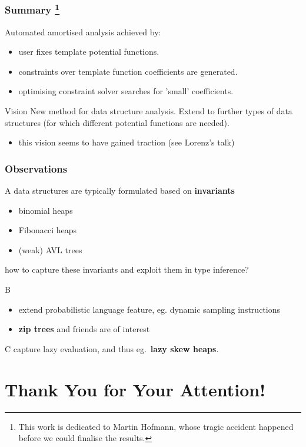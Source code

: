 \documentclass[
11pt,
usepdftitle=false,
aspectratio=169,
xcolor={table,usenames,dvipsnames},
]{beamer}
\newenvironment{mybox}[1]{\begin{block}{#1}}{\end{block}}
\begin{document}
\begin{frame}
  \frametitle{Summary%
    \footnote{This work is dedicated to Martin Hofmann, whose tragic accident happened before we could finalise the results.}
  }
  \vspace{-1ex}
  Automated amortised analysis achieved by:
  \begin{itemize}
  \item user fixes template potential functions.
  \item constraints over template function coefficients are generated.
  \item optimising constraint solver searches for 'small' coefficients.
  \end{itemize}

  \medskip
  
  \begin{mybox}{Vision}
    New method for data structure analysis. Extend to further types of data structures (for which different potential functions are needed).
  \end{mybox}

  \medskip

  \begin{itemize}
  \item this vision seems to have gained traction (see Lorenz's talk)
  \end{itemize}
\end{frame}  

\begin{frame}
\frametitle{Observations}
\vspace{-1mm}
\begin{mybox}{A}
  data structures are typically formulated based on \textbf{invariants}
  \begin{itemize}
  \item binomial heaps
  \item Fibonacci heaps
  \item (weak) AVL trees
  \end{itemize}
  how to capture these invariants and exploit them in type inference?
\end{mybox}
\vspace{-1mm}
\begin{mybox}{B}
    \begin{itemize}
    \item extend probabilistic language feature, eg. dynamic sampling instructions
    \item \textbf{zip trees} and friends are of interest
    \end{itemize}
\end{mybox}
\vspace{-1mm}
\begin{mybox}{C}
  capture lazy evaluation, and thus eg.\ \textbf{lazy skew heaps}.
\end{mybox}

\end{frame}  

\section{Thank You for Your Attention!}

% 
% 
\end{document}
